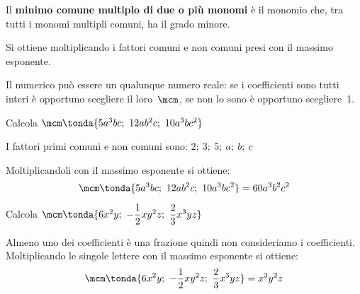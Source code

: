 \begin{definizione}{}{}
Il \textbf{minimo comune multiplo di due o più monomi}
è il monomio che, tra tutti i monomi multipli comuni,
ha il grado minore.

Si ottiene moltiplicando i fattori comuni e non comuni presi con il massimo 
esponente.
\end{definizione}

Il  numerico può essere un qualunque 
numero reale: se i coefficienti sono tutti interi è opportuno scegliere 
il loro~\(\mcm\), se non lo sono è opportuno scegliere~1.

% 
% 
% 
% 
% 
% 
\begin{esempio}{}{}
Calcola \(\mcm \tonda{5a^{3}bc;~12ab^{2}c;~10a^{3}bc^{2}}\)

I fattori primi comuni e non comuni sono: \quad 
\(2;~3;~5;~a;~b;~c\)

Moltiplicandoli con il massimo esponente si ottiene:
\[\mcm \tonda{5a^{3}bc;~12ab^{2}c;~10a^{3}bc^{2}} = 60a^{3}b^{2}c^{2}\]
\end{esempio}

\begin{esempio}{}{}
Calcola 
\(\mcm \tonda{6x^{2}y;~-\dfrac{1}{2}xy^{2}z;~\dfrac{2}{3}x^{3}yz}\)

Almeno uno dei coefficienti è una frazione quindi non consideriamo i 
coefficienti.
Moltiplicando le singole lettere con il massimo esponente si ottiene:
\[\mcm \tonda{6x^{2}y;~-\frac{1}{2}xy^{2}z;~\frac{2}{3}x^{3}yz} = 
x^{3}y^{2}z\]
\end{esempio}

